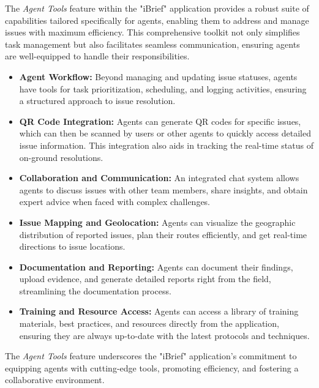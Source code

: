 The \textit{Agent Tools} feature within the "iBrief" application provides a robust suite of capabilities tailored specifically for agents, enabling them to address and manage issues with maximum efficiency. This comprehensive toolkit not only simplifies task management but also facilitates seamless communication, ensuring agents are well-equipped to handle their responsibilities.

\begin{itemize}
    \item \textbf{Agent Workflow:}
    Beyond managing and updating issue statuses, agents have tools for task prioritization, scheduling, and logging activities, ensuring a structured approach to issue resolution.

    \item \textbf{QR Code Integration:}
    Agents can generate QR codes for specific issues, which can then be scanned by users or other agents to quickly access detailed issue information. This integration also aids in tracking the real-time status of on-ground resolutions.

    \item \textbf{Collaboration and Communication:}
    An integrated chat system allows agents to discuss issues with other team members, share insights, and obtain expert advice when faced with complex challenges.

    \item \textbf{Issue Mapping and Geolocation:}
    Agents can visualize the geographic distribution of reported issues, plan their routes efficiently, and get real-time directions to issue locations.

   

    \item \textbf{Documentation and Reporting:}
    Agents can document their findings, upload evidence, and generate detailed reports right from the field, streamlining the documentation process.
    
    \item \textbf{Training and Resource Access:}
    Agents can access a library of training materials, best practices, and resources directly from the application, ensuring they are always up-to-date with the latest protocols and techniques.
\end{itemize}

The \textit{Agent Tools} feature underscores the "iBrief" application's commitment to equipping agents with cutting-edge tools, promoting efficiency, and fostering a collaborative environment.
